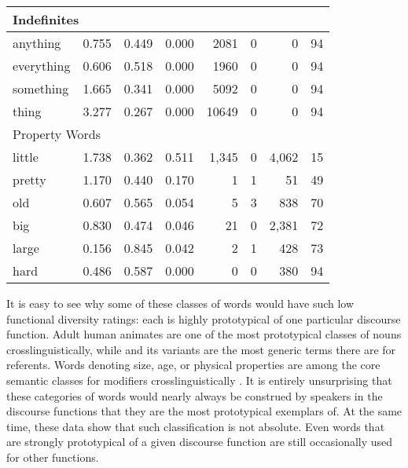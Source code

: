 \begin{table}
\begin{tabular}{ l r r r r r r r }
    \midrule
    \multicolumn{6}{l}{Indefinites}\\
    \midrule
    anything   & 0.755 & 0.449 & 0.000 & 2081  & 0 & 0 & 94\\
    everything & 0.606 & 0.518 & 0.000 & 1960  & 0 & 0 & 94\\
    something  & 1.665 & 0.341 & 0.000 & 5092  & 0 & 0 & 94\\
    thing      & 3.277 & 0.267 & 0.000 & 10649 & 0 & 0 & 94\\

    \midrule
    \multicolumn{6}{l}{Property Words}\\
    \midrule
    little & 1.738 & 0.362 & 0.511 & 1,345 & 0 & 4,062 & 15\\
    pretty & 1.170 & 0.440 & 0.170 &     1 & 1 &    51 & 49\\
    old    & 0.607 & 0.565 & 0.054 &     5 & 3 &   838 & 70\\
    big    & 0.830 & 0.474 & 0.046 &    21 & 0 & 2,381 & 72\\
    large  & 0.156 & 0.845 & 0.042 &     2 & 1 &   428 & 73\\
    hard   & 0.486 & 0.587 & 0.000 &     0 & 0 &   380 & 94\\

    \bottomrule
  \end{tabular}
\end{table}

It is easy to see why some of these classes of words would have such low functional diversity ratings: each is highly prototypical of one particular discourse function. Adult human animates are one of the most prototypical classes of nouns crosslinguistically, while  and its variants are the most generic terms there are for referents. Words denoting size, age, or physical properties are among the core semantic classes for modifiers crosslinguistically \parencite{Dixon1977}. It is entirely unsurprising that these categories of words would nearly always be construed by speakers in the discourse functions that they are the most prototypical exemplars of. At the same time, these data show that such classification is not absolute. Even words that are strongly prototypical of a given discourse function are still occasionally used for other functions.

